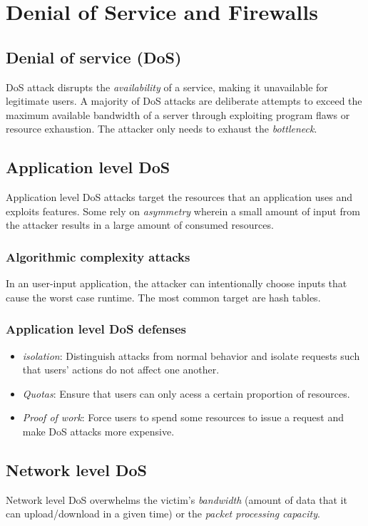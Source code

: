 \chapter{Denial of Service and Firewalls}

\section{Denial of service (DoS)}
DoS attack disrupts the \emph{availability} of a service, making it unavailable for legitimate users. A majority of DoS attacks are deliberate attempts to exceed the maximum available bandwidth of a server through exploiting program flaws or resource exhaustion. The attacker only needs to exhaust the \emph{bottleneck}.

\section{Application level DoS}
Application level DoS attacks target the resources that an application uses and exploits features. Some rely on \emph{asymmetry} wherein a small amount of input from the attacker results in a large amount of consumed resources.

\subsection{Algorithmic complexity attacks}
In an user-input application, the attacker can intentionally choose inputs that cause the worst case runtime. The most common target are hash tables.

\subsection{Application level DoS defenses}
\begin{itemize}
    \item \emph{isolation}: Distinguish attacks from normal behavior and isolate requests such that users' actions do not affect one another.
    \item \emph{Quotas}: Ensure that users can only acess a certain proportion of resources.
    \item \emph{Proof of work}: Force users to spend some resources to issue a request and make DoS attacks more expensive.
\end{itemize}

\section{Network level DoS}
 Network level DoS overwhelms the victim's \emph{bandwidth} (amount of data that it can upload/download in a given time) or the \emph{packet processing capacity}.
 
